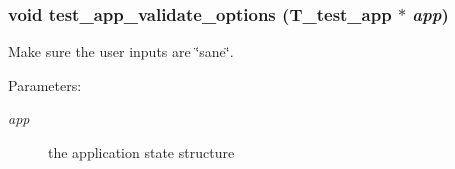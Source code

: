 \subsubsection{\setlength{\rightskip}{0pt plus 5cm}void test\_\-app\_\-validate\_\-options ({\bf T\_\-test\_\-app} $\ast$ {\em app})}\label{group__test__app_a5}


Make sure the user inputs are \char`\"{}sane\char`\"{}.

\begin{Desc}
\item[Parameters: ]\par
\begin{description}
\item[{\em 
app}]the application state structure \end{description}
\end{Desc}

